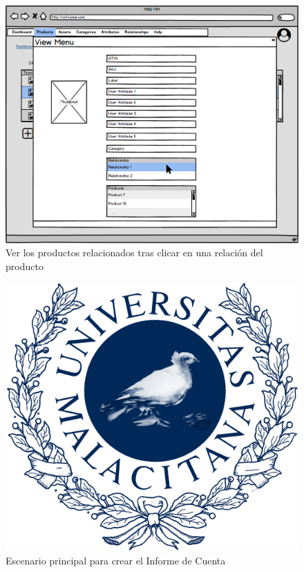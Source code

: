 \begin{figure}[H]
    \includegraphics[width=1\linewidth]{assets/mockups/RF5.2_2.png}
    \caption{Ver los productos relacionados tras clicar en una relación del producto}
   \end{figure}
\vspace{1.0cm}

\newpage %

\begin{figure}[H]
    \includegraphics[width=1\linewidth]{assets/umaLogo.png}
    \caption{Escenario principal para crear el Informe de Cuenta}
   \end{figure}
\vspace{1.0cm}

\newpage %